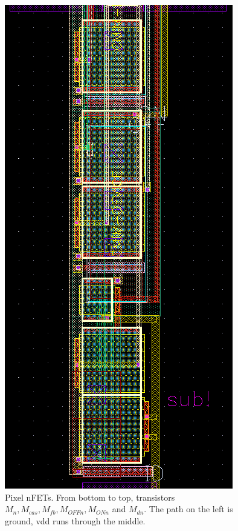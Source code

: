 \begin{figure}
	\center
	\includegraphics{pixel1.png}
	\caption{Pixel nFETs. From bottom to top, transistors $M_n, M_{cas}, M_{fb}, M_{OFFn}, M_{ONn}$ and $M_{dn}$. The path on the left is ground, vdd runs through the middle.}
	\label{uno}
\end{figure}

